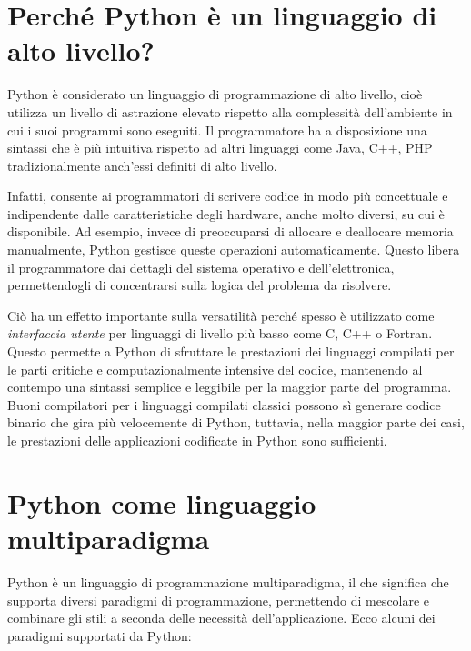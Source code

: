 \documentclass[
  letterpaper,
]{scrbook}
\begin{document}
\section{Perché Python è un linguaggio di alto
livello?}\label{perchuxe9-python-uxe8-un-linguaggio-di-alto-livello}

Python è considerato un linguaggio di programmazione di alto livello,
cioè utilizza un livello di astrazione elevato rispetto alla complessità
dell'ambiente in cui i suoi programmi sono eseguiti. Il programmatore ha
a disposizione una sintassi che è più intuitiva rispetto ad altri
linguaggi come Java, C++, PHP tradizionalmente anch'essi definiti di
alto livello.

Infatti, consente ai programmatori di scrivere codice in modo più
concettuale e indipendente dalle caratteristiche degli hardware, anche
molto diversi, su cui è disponibile. Ad esempio, invece di preoccuparsi
di allocare e deallocare memoria manualmente, Python gestisce queste
operazioni automaticamente. Questo libera il programmatore dai dettagli
del sistema operativo e dell'elettronica, permettendogli di concentrarsi
sulla logica del problema da risolvere.

Ciò ha un effetto importante sulla versatilità perché spesso è
utilizzato come \emph{interfaccia utente} per linguaggi di livello più
basso come C, C++ o Fortran. Questo permette a Python di sfruttare le
prestazioni dei linguaggi compilati per le parti critiche e
computazionalmente intensive del codice, mantenendo al contempo una
sintassi semplice e leggibile per la maggior parte del programma. Buoni
compilatori per i linguaggi compilati classici possono sì generare
codice binario che gira più velocemente di Python, tuttavia, nella
maggior parte dei casi, le prestazioni delle applicazioni codificate in
Python sono sufficienti.

\section{Python come linguaggio
multiparadigma}\label{python-come-linguaggio-multiparadigma}

Python è un linguaggio di programmazione multiparadigma, il che
significa che supporta diversi paradigmi di programmazione, permettendo
di mescolare e combinare gli stili a seconda delle necessità
dell'applicazione. Ecco alcuni dei paradigmi supportati da Python:
\end{document}
